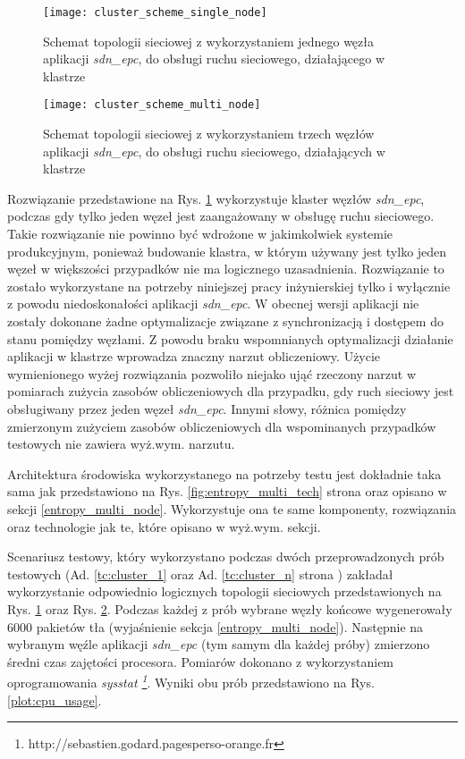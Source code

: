 \begin{figure}[h]
\centering
\texttt{[image: cluster\_scheme\_single\_node]}
\caption{Schemat topologii sieciowej z wykorzystaniem jednego węzła aplikacji
   \textit{sdn\_epc}, do obsługi ruchu sieciowego, działającego w klastrze}
\label{fig:cluster_scheme_single_node}
\end{figure}
\newpage

\begin{figure}[h]
\centering
\texttt{[image: cluster\_scheme\_multi\_node]}
\caption{Schemat topologii sieciowej z wykorzystaniem trzech węzłów aplikacji
  \textit{sdn\_epc}, do obsługi ruchu sieciowego, działających w klastrze}
\label{fig:cluster_scheme_multi_node}
\end{figure}

Rozwiązanie przedstawione na Rys. \ref{fig:cluster_scheme_single_node}
wykorzystuje klaster węzłów \textit{sdn\_epc}, podczas gdy tylko jeden węzeł
jest zaangażowany w obsługę ruchu sieciowego. Takie rozwiązanie nie powinno być
wdrożone w jakimkolwiek systemie produkcyjnym, ponieważ budowanie klastra, w
którym używany jest tylko jeden węzeł w większości przypadków nie ma logicznego
uzasadnienia. Rozwiązanie to zostało wykorzystane na potrzeby niniejszej pracy
inżynierskiej tylko i wyłącznie z powodu niedoskonałości aplikacji
\textit{sdn\_epc}. W obecnej wersji aplikacji nie zostały dokonane żadne
optymalizacje związane z synchronizacją i dostępem do stanu pomiędzy węzłami. Z
powodu braku wspomnianych optymalizacji działanie aplikacji w klastrze wprowadza
znaczny narzut obliczeniowy. Użycie wymienionego wyżej rozwiązania pozwoliło
niejako ująć rzeczony narzut w pomiarach zużycia zasobów obliczeniowych dla
przypadku, gdy ruch sieciowy jest obsługiwany przez jeden węzeł
\textit{sdn\_epc}. Innymi słowy, różnica pomiędzy zmierzonym zużyciem zasobów
obliczeniowych dla wspominanych przypadków testowych nie zawiera wyż.wym.
narzutu. 

Architektura środowiska wykorzystanego na potrzeby testu jest dokładnie taka
sama jak przedstawiono na Rys. \ref{fig:entropy_multi_tech} strona
\pageref{fig:entropy_multi_tech} oraz opisano w sekcji \ref{entropy_multi_node}.
Wykorzystuje ona te same komponenty, rozwiązania oraz technologie jak te, które
opisano w wyż.wym. sekcji.

Scenariusz testowy, który wykorzystano podczas dwóch przeprowadzonych prób
testowych (Ad. \ref{tc:cluster_1} oraz Ad. \ref{tc:cluster_n} strona
\pageref{tc:cluster_1}) zakładał wykorzystanie odpowiednio logicznych topologii
sieciowych przedstawionych na Rys. \ref{fig:cluster_scheme_single_node} oraz
Rys. \ref{fig:cluster_scheme_multi_node}. Podczas każdej z prób wybrane węzły
końcowe wygenerowały 6000 pakietów tła (wyjaśnienie sekcja
\ref{entropy_multi_node}). Następnie na wybranym węźle aplikacji
\textit{sdn\_epc} (tym samym dla każdej próby) zmierzono średni czas zajętości 
procesora. Pomiarów dokonano z wykorzystaniem oprogramowania \textit{sysstat
  \footnote{http://sebastien.godard.pagesperso-orange.fr}}. Wyniki obu prób
przedstawiono na Rys. \ref{plot:cpu_usage}.

